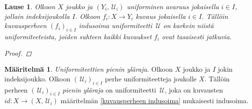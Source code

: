 \documentclass[12pt,a4paper,leqno]{report}
\newcommand{\U}{\,\mathcal{U}}
\theoremstyle{plain}
\newtheorem{lause}[equation]{Lause}
\theoremstyle{definition}
\newtheorem{maar}[equation]{Määritelmä}
\theoremstyle{remark}
\begin{document}
\begin{lause}
Olkoon $X$ joukko ja $(Y_i,\U_i)$ uniforminen avaruus jokaisella $i\in I$, jollain indeksijoukolla $I$. 
Olkoon $f_i\colon X\rightarrow Y_i$ kuvaus jokaisella $i\in I$.
Tällöin kuvausperheen $(f_i)_{i\in I}$ indusoima uniformiteetti $\U$ on karkein niistä uniformiteeteista, 
joiden suhteen kaikki kuvaukset $f_i$ ovat tasaisesti jatkuvia.
\begin{proof}
\end{proof}
\end{lause}
\begin{maar}
\emph{Uniformiteettien pienin yläraja.}
Olkoon $X$ joukko ja $I$ jokin indeksijoukko.
Olkoon $(\U_i)_{i\in I}$ perhe uniformiteetteja joukolle $X$.
Tällöin perheen $(\U_i)_{i\in I}$ \emph{pienin yläraja} on uniformiteetti $\U$, joka on kuvausten $id\colon X\rightarrow (X,\U_i)$ määritelmän \ref{kuvausperheen indusoima} mukaisesti indusoima.
\end{maar}
\end{document}
